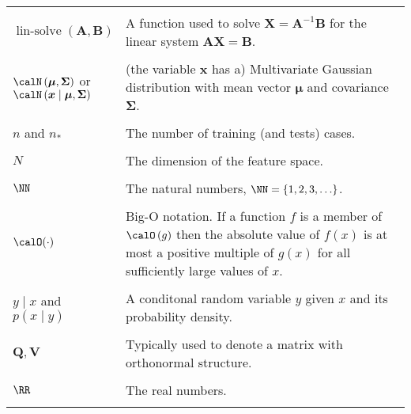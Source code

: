 \begin{longtable}{lp{}}
    \\\\
    $\operatorname{lin-solve} \left( \bm{A}, \bm{B} \right)$                                                   & A function used to solve $\bm{X} = \bm{A}^{-1} \bm{B}$ for the linear system $\bm{A} \bm{X} = \bm{B}$.
    \\\\
    $\calN \left( \bm{\mu} , \bm{\Sigma} \right)$ or $\calN \left( \bm{x} \mid \bm{\mu} , \bm{\Sigma} \right)$ & (the variable $\bm{x}$ has a) Multivariate Gaussian distribution with mean vector $\bm{\mu}$ and covariance $\bm{\Sigma}$.
    \\\\
    $n$ and $n_{\ast}$                                                                                         & The number of training (and tests) cases.
    \\\\
    $N$                                                                                                        & The dimension of the feature space.
    \\\\
    $\NN$                                                                                                      & The natural numbers, $\NN = \left\{ 1,2,3,\ldots \right\}$.
    \\\\
    $\calO (\cdot)$                                                                                            & Big-O notation. If a function $f$ is a member of $\calO \left( g \right)$ then the absolute value of $f(x)$ is at most a positive multiple of $g(x)$ for all sufficiently large values of $x$.
    \\\\
    $y \mid x$ and $p \left( x \mid y \right)$                                                                 & A conditonal random variable $y$ given $x$ and its probability density.
    \\\\
    $\bm{Q}, \bm{V}$                                                                                           & Typically used to denote a matrix with orthonormal structure.
    \\\\
    $\RR$                                                                                                      & The real numbers.
    \\\\

\end{longtable}
